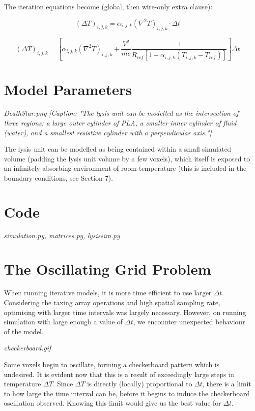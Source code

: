 \documentclass{article}
\begin{document}
The iteration equations become (global, then wire-only extra clause):

\begin{equation}
    (\Delta T)_{i,j,k} = \alpha_{i,j,k}(\nabla^2T)_{i,j,k}\cdot\Delta t
\end{equation}

\begin{equation}
    (\Delta T)_{i,j,k} = \left[\alpha_{i,j,k}(\nabla^2T)_{i,j,k} + \frac{V^2}{mc}\frac{1}{R_{ref}[1+\alpha_{i,j,k}(T_{i,j,k}-T_{ref})]}\right]\Delta t
\end{equation}

\section{Model Parameters}
\emph{DeathStar.png [Caption: "The lysis unit can be modelled as the intersection of three regions: a large outer cylinder of PLA, a smaller inner cylinder of fluid (water), and a smallest resistive cylinder with a perpendicular axis."]}

The lysis unit can be modelled as being contained within a small simulated volume (padding the lysis unit volume by a few voxels), which itself is exposed to an infinitely absorbing environment of room temperature (this is included in the boundary conditions, see Section 7).

\section{Code}
\emph{simulation.py, matrices.py, lysissim.py}
\section{The Oscillating Grid Problem}

When running iterative models, it is more time efficient to use larger $\Delta t$. Considering the taxing array operations and high spatial sampling rate, optimising with larger time intervals was largely necessary. However, on running simulation with large enough a value of $\Delta t$, we encounter unexpected behaviour of the model.

\emph{checkerboard.gif}

Some voxels begin to oscillate, forming a checkerboard pattern which is undesired. It is evident now that this is a result of exceedingly large steps in temperature $\Delta T$. Since $\Delta T$ is directly (locally) proportional to $\Delta t$, there is a limit to how large the time interval can be, before it begins to induce the checkerboard oscillation observed. Knowing this limit would give us the best value for $\Delta t$.
\end{document}
